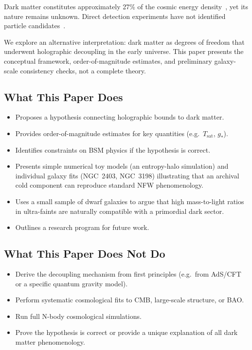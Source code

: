 \documentclass[11pt,a4paper]{article}
\begin{document}
Dark matter constitutes approximately 27\% of the cosmic energy density~\citep{Planck2018}, yet its nature remains unknown. Direct detection experiments have not identified particle candidates~\citep{LZ2022}.

We explore an alternative interpretation: dark matter as degrees of freedom that underwent holographic decoupling in the early universe. This paper presents the conceptual framework, order-of-magnitude estimates, and preliminary galaxy-scale consistency checks, not a complete theory.

\subsection{What This Paper Does}

\begin{itemize}
\item Proposes a hypothesis connecting holographic bounds to dark matter.
\item Provides order-of-magnitude estimates for key quantities (e.g.\ $T_{\mathrm{sat}}$, $g_*$).
\item Identifies constraints on BSM physics if the hypothesis is correct.
\item Presents simple numerical toy models (an entropy-halo simulation) and individual galaxy fits (NGC~2403, NGC~3198) illustrating that an archival cold component can reproduce standard NFW phenomenology.
\item Uses a small sample of dwarf galaxies to argue that high mass-to-light ratios in ultra-faints are naturally compatible with a primordial dark sector.
\item Outlines a research program for future work.
\end{itemize}

\subsection{What This Paper Does Not Do}

\begin{itemize}
\item Derive the decoupling mechanism from first principles (e.g.\ from AdS/CFT or a specific quantum gravity model).
\item Perform systematic cosmological fits to CMB, large-scale structure, or BAO.
\item Run full N-body cosmological simulations.
\item Prove the hypothesis is correct or provide a unique explanation of all dark matter phenomenology.
\end{itemize}
\end{document}
